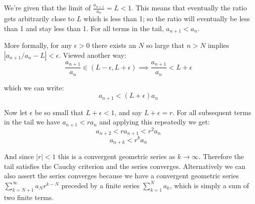 \documentclass{article}
\begin{document}
We're given that the limit of $\frac{a_{n+1}}{a_n} = L < 1$. This means that eventually the ratio gets arbitrarily close to $L$ which is less than 1; so the ratio will eventually be less than 1 and stay less than 1. For all terms in the tail, $a_{n+1} < a_n$.

More formally, for any $\epsilon > 0$ there exists an $N$ so large that $n > N$ implies $|a_{n+1}/a_n - L| < \epsilon$. Viewed another way:
$$\frac{a_{n+1}}{a_n} \in (L - \epsilon, L + \epsilon) \implies \frac{a_{n+1}}{a_n} < L + \epsilon$$

which we can write:
$$a_{n+1} < (L + \epsilon) a_n$$

Now let $\epsilon$ be so small that $L + \epsilon < 1$, and say $L + \epsilon = r$. For all subsequent terms in the tail we have $a_{n+1} < ra_n$ and applying this repeatedly we get:
$$a_{n+2} < r a_{n+1} < r^2 a_n$$
$$a_{n + k} < r^k a_n$$

And since $|r| < 1$ this is a convergent geometric series as $k \to \infty$. Therefore the tail satisfies the Cauchy criterion and the series converges. Alternatively we can also assert the series converges because we have a convergent geometric series $\sum\limits_{k = N +1 }^{\infty} a_N r^{k - N}$ preceded by a finite series $\sum\limits_{k=1}^N a_k$, which is simply a sum of two finite terms.
\end{document}
